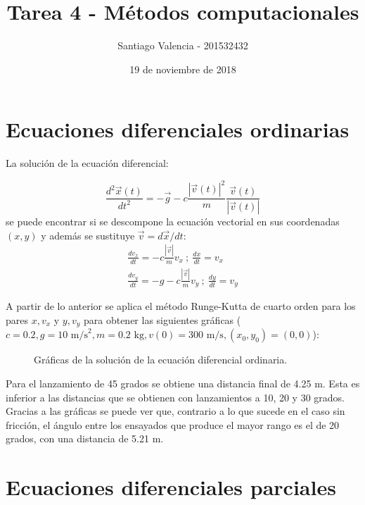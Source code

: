 \documentclass{article}
\title{Tarea 4 - Métodos computacionales}
\author{Santiago Valencia - 201532432}
\date{19 de noviembre de 2018}
\begin{document}
\maketitle

\section*{Ecuaciones diferenciales ordinarias}

La solución de la ecuación diferencial:

\begin{equation*}
    \frac{d^2\vec{x}(t)}{dt^2} = -\vec{g} - c\frac{|\vec{v}(t)|^2}{m}\frac{\vec{v}(t)}{|\vec{v}(t)|}
\end{equation*}
se puede encontrar si se descompone la ecuación vectorial en sus coordenadas $(x, y)$ y además se sustituye $\vec{v} = d\vec{x}/dt$:
\begin{gather*}
    \frac{dv_x}{dt} = -c\frac{|\vec{v}|}{m}v_x \ ; \ \frac{dx}{dt} = v_x \\
    \frac{dv_y}{dt} = -g - c\frac{|\vec{v}|}{m}v_y \ ; \ \frac{dy}{dt} = v_y
\end{gather*}

A partir de lo anterior se aplica el método Runge-Kutta de cuarto orden para los pares $x, v_x$ y $y, v_y$ para obtener las siguientes gráficas ($c = 0.2, g = 10 \text{ m/s}^2, m = 0.2 \text{ kg}, v(0) = 300 \text{ m/s}, (x_0, y_0) = (0, 0)$):

\begin{figure}[h]
\centering
    \caption{Gráficas de la solución de la ecuación diferencial ordinaria.}
    \label{fig:ODEs}
\end{figure}

Para el lanzamiento de 45 grados se obtiene una distancia final de 4.25 m. Esta es inferior a las distancias que se obtienen con lanzamientos a 10, 20 y 30 grados. Gracias a las gráficas se puede ver que, contrario a lo que sucede en el caso sin fricción, el ángulo entre los ensayados que produce el mayor rango es el de 20 grados, con una distancia de 5.21 m.


\section*{Ecuaciones diferenciales parciales}
\end{document}
